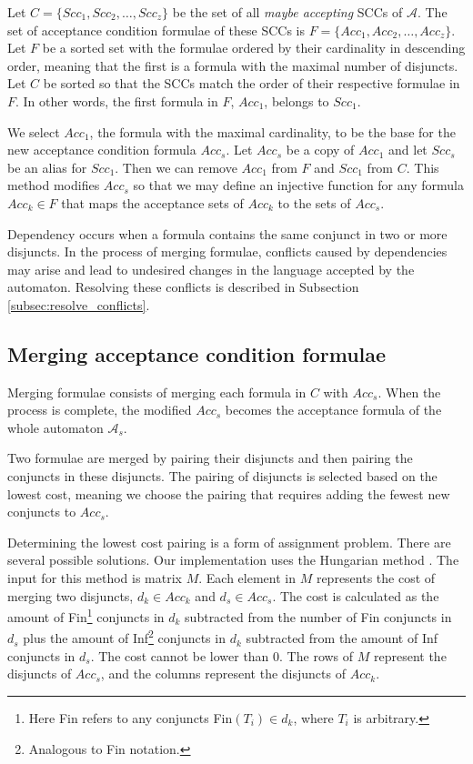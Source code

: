 \documentclass[
  digital, %
  twoside, %
  table,   %
  lof,     %
  lot,     %
]{fithesis3}
\begin{document}
Let $C = \{Scc_1, Scc_2, \dots, Scc_z\}$ be the set of all \emph{maybe accepting} SCCs of $\mathcal{A}$. The set of acceptance condition formulae of these SCCs is $F = \{Acc_1, Acc_2, \dots, Acc_z\}$. Let $F$ be a sorted set with the formulae ordered by their cardinality in descending order, meaning that the first is a formula with the maximal number of disjuncts. Let $C$ be sorted so that the SCCs match the order of their respective formulae in $F$. In other words, the first formula in $F$, $Acc_1$, belongs to $Scc_1$.

We select $Acc_1$, the formula with the maximal cardinality, to be the base for the new acceptance condition formula $Acc_s$. Let $Acc_s$ be a copy of $Acc_1$ and let $Scc_s$ be an alias for $Scc_1$. Then we can remove $Acc_1$ from $F$ and $Scc_1$ from $C$. This method modifies $Acc_s$ so that we may define an injective function for any formula $Acc_k \in F$ that maps the acceptance sets of $Acc_k$ to the sets of $Acc_s$. 

Dependency occurs when a formula contains the same conjunct in two or more disjuncts. In the process of merging formulae, conflicts caused by dependencies may arise and lead to undesired changes in the language accepted by the automaton. Resolving these conflicts is described in Subsection \ref{subsec:resolve_conflicts}. 

\subsection{Merging acceptance condition formulae}
Merging formulae consists of merging each formula in $C$ with $Acc_s$. When the process is complete, the modified $Acc_s$ becomes the acceptance formula of the whole automaton $\mathcal{A}_s$.

Two formulae are merged by pairing their disjuncts and then pairing the conjuncts in these disjuncts. The pairing of disjuncts is selected based on the lowest cost, meaning we choose the pairing that requires adding the fewest new conjuncts to $Acc_s$. 

Determining the lowest cost pairing is a form of assignment problem. There are several possible solutions. Our implementation uses the Hungarian method \cite{hungarian_method}. The input for this method is matrix $M$. Each element in $M$ represents the cost of merging two disjuncts, $d_k \in Acc_k$ and $d_s \in Acc_s$. The cost is calculated as the amount of Fin\footnote{Here Fin refers to any conjuncts Fin$(T_i) \in d_k$, where $T_i$ is arbitrary.} conjuncts in $d_k$ subtracted from the number of Fin conjuncts in $d_s$ plus the amount of Inf\footnote{Analogous to Fin notation.} conjuncts in $d_k$ subtracted from the amount of Inf conjuncts in $d_s$. The cost cannot be lower than 0. The rows of $M$ represent the disjuncts of $Acc_s$, and the columns represent the disjuncts of $Acc_k$.
\end{document}
